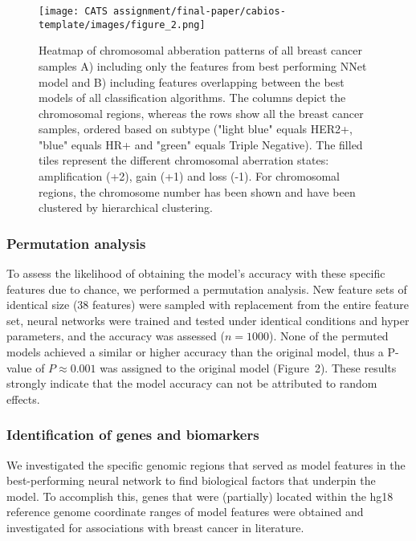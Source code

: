         \begin{figure}[h]%
            \texttt{[image: CATS assignment/final-paper/cabios-template/images/figure\_2.png]}
            \caption{Heatmap of chromosomal abberation patterns of all breast cancer samples A) including only the features from best performing NNet model and B) including features overlapping between the best models of all classification algorithms. The columns depict the chromosomal regions, whereas the rows show all the breast cancer samples, ordered based on subtype ("light blue" equals HER2+, "blue" equals HR+ and "green" equals Triple Negative). The filled tiles represent the different chromosomal aberration states: amplification (+2), gain (+1) and loss (-1). For chromosomal regions, the chromosome number has been shown and have been clustered by hierarchical clustering.}\label{fig:02}
        \end{figure}

    \subsubsection{Permutation analysis}
        To assess the likelihood of obtaining the model's accuracy with these specific features due to chance, we performed a permutation analysis. New feature sets of identical size ($38$ features) were sampled with replacement from the entire feature set, neural networks were trained and tested under identical conditions and hyper parameters, and the accuracy was assessed ($n=1000$). None of the permuted models achieved a similar or higher accuracy than the original model, thus a P-value of $P \approx 0.001$ was assigned to the original model (Figure~2\vphantom{\ref{fig:02}}). These results strongly indicate that the model accuracy can not be attributed to random effects.

    \subsubsection{Identification of genes and biomarkers}
        We investigated the specific genomic regions that served as model features in the best-performing neural network to find biological factors that underpin the model. To accomplish this, genes that were (partially) located within the hg18 reference genome coordinate ranges of model features were obtained and investigated for associations with breast cancer in literature.
        
